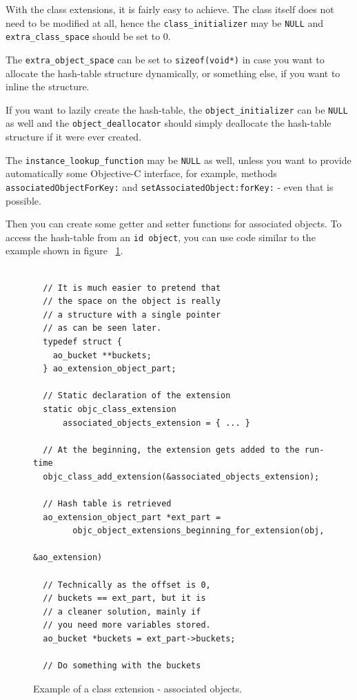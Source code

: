 With the class extensions, it is fairly easy to achieve. The class itself does not need to be modified at all, hence the \verb=class_initializer= may be \verb=NULL= and \verb=extra_class_space= should be set to 0.

The \verb=extra_object_space= can be set to \verb=sizeof(void*)= in case you want to allocate the hash-table structure dynamically, or something else, if you want to inline the structure.

If you want to lazily create the hash-table, the \verb=object_initializer= can be \verb=NULL= as well and the \verb=object_deallocator= should simply deallocate the hash-table structure if it were ever created.

The \verb=instance_lookup_function= may be \verb=NULL= as well, unless you want to provide automatically some Objective-C interface, for example, methods \newline{}\verb=associatedObjectForKey:= and \verb=setAssociatedObject:forKey:= - even that is possible.

Then you can create some getter and setter functions for associated objects. To access the hash-table from an \verb=id object=, you can use code similar to the example shown in figure ~\ref{fig:class_ext_ao}.

\begin{figure}[H] 
\begin{verbatim}
  
  // It is much easier to pretend that
  // the space on the object is really
  // a structure with a single pointer
  // as can be seen later.
  typedef struct {
    ao_bucket **buckets;
  } ao_extension_object_part;
  
  // Static declaration of the extension
  static objc_class_extension 
      associated_objects_extension = { ... }

  // At the beginning, the extension gets added to the run-time
  objc_class_add_extension(&associated_objects_extension);

  // Hash table is retrieved
  ao_extension_object_part *ext_part = 
        objc_object_extensions_beginning_for_extension(obj, 
                                                      &ao_extension)

  // Technically as the offset is 0,
  // buckets == ext_part, but it is
  // a cleaner solution, mainly if
  // you need more variables stored.
  ao_bucket *buckets = ext_part->buckets;
        
  // Do something with the buckets
\end{verbatim}
  \centering{}
  \caption{Example of a class extension - associated objects.}
  \label{fig:class_ext_ao}
\end{figure}


